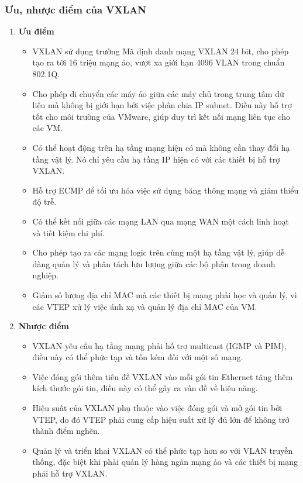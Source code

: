 \documentclass[13pt]{article}
\begin{document}
\subsubsection{Ưu, nhược điểm của VXLAN}
\begin{enumerate}
    \item \textbf{Ưu điểm}
    \begin{itemize}
        \item VXLAN sử dụng trường Mã định danh mạng VXLAN 24 bit, cho phép tạo ra tới 16 triệu mạng ảo, vượt xa giới hạn 4096 VLAN trong chuẩn 802.1Q.
        \item Cho phép di chuyển các máy ảo giữa các máy chủ trong trung tâm dữ liệu mà không bị giới hạn bởi việc phân chia IP subnet. Điều này hỗ trợ tốt cho môi trường của VMware, giúp duy trì kết nối mạng liên tục cho các VM.
        \item Có thể hoạt động trên hạ tầng mạng hiện có mà không cần thay đổi hạ tầng vật lý. Nó chỉ yêu cầu hạ tầng IP hiện có với các thiết bị hỗ trợ VXLAN.
        \item Hỗ trợ ECMP để tối ưu hóa việc sử dụng băng thông mạng và giảm thiểu độ trễ.
        \item Có thể kết nối giữa các mạng LAN qua mạng WAN một cách linh hoạt và tiết kiệm chi phí.
        \item Cho phép tạo ra các mạng logic trên cùng một hạ tầng vật lý, giúp dễ dàng quản lý và phân tách lưu lượng giữa các bộ phận trong doanh nghiệp.
        \item Giảm số lượng địa chỉ MAC mà các thiết bị mạng phải học và quản lý, vì các VTEP xử lý việc ánh xạ và quản lý địa chỉ MAC của VM.
    \end{itemize}

    \item \textbf{Nhược điểm}
    \begin{itemize}
        \item VXLAN yêu cầu hạ tầng mạng phải hỗ trợ multicast (IGMP và PIM), điều này có thể phức tạp và tốn kém đối với một số mạng.
        \item Việc đóng gói thêm tiêu đề VXLAN vào mỗi gói tin Ethernet tăng thêm kích thước gói tin, điều này có thể gây ra vấn đề về hiệu năng.
        \item Hiệu suất của VXLAN phụ thuộc vào việc đóng gói và mở gói tin bởi VTEP, do đó VTEP phải cung cấp hiệu suất xử lý đủ lớn để không trở thành điểm nghẽn.
        \item Quản lý và triển khai VXLAN có thể phức tạp hơn so với VLAN truyền thống, đặc biệt khi phải quản lý hàng ngàn mạng ảo và các thiết bị mạng phải hỗ trợ VXLAN.
    \end{itemize}
\end{enumerate}
\end{document}
